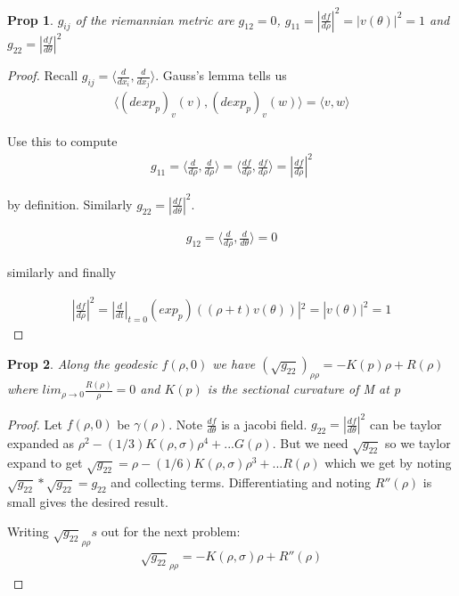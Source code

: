 \documentclass[11pt]{article}
\newtheorem{prop}{Prop}
\begin{document}
\begin{prop}
	$g_{ij}$ of the riemannian metric are $g_{12} = 0$, $g_{11} = |\frac{df}{d\rho}|^2 = |v(\theta)|^2 = 1$ and $g_{22} = |\frac{df}{d\theta}|^2$
\end{prop}

\begin{proof}
	Recall $g_{ij} = \langle \frac{d}{dx_i},\frac{d}{dx_j}\rangle$. Gauss's lemma tells us 
	\begin{align*}
		\langle (dexp_p)_v(v),(d exp_p)_v(w) \rangle  = \langle v,w\rangle
	\end{align*}

	Use this to compute
	\begin{align*}
		g_{11} = \langle \frac{d}{d \rho}, \frac{d}{d \rho}\rangle = \langle \frac{d f}{d \rho}, \frac{d f}{d \rho}\rangle = |\frac{d f}{d \rho}|^2
	\end{align*}

	by definition. Similarly $g_{22} = |\frac{d f}{d\theta}|^2$.

	\begin{align*}
		g_{12} = \langle \frac{d}{d \rho}, \frac{d}{d \theta} \rangle = 0 
	\end{align*}

	similarly and finally%

	\begin{align*}
		|\frac{df}{d\rho}|^2 = |\frac{d}{dt}|_{t=0}(exp_p)((\rho + t)v(\theta))|^2 = |v(\theta)|^2 = 1
	\end{align*}

\end{proof}

\begin{prop}
	Along the geodesic $f(\rho,0)$ we have
	$(\sqrt{g_{22}})_{\rho \rho} = -K(p)\rho + R(\rho)$ where $lim_{\rho \to 0} \frac{R(\rho)}{\rho} = 0$ and $K(p)$ is the sectional curvature of M at p
\end{prop}

\begin{proof}
	Let $f(\rho,0)$ be $\gamma(\rho)$. Note $\frac{df}{d\theta}$ is a jacobi field. %
	$g_{22}=|\frac{df}{d\theta}|^2$ can be taylor expanded as $\rho^2 - (1/3)K(\rho,\sigma)\rho^4 + ... G(\rho)$. But we need $\sqrt{g_{22}}$ so we taylor expand to get $\sqrt{g_{22}} = \rho - (1/6)K(\rho,\sigma)\rho^3 + ... R(\rho)$ which we get by noting $\sqrt{g_{22}} * \sqrt{g_{22}} = g_{22}$ and collecting terms. Differentiating and noting $R''(\rho)$ is small gives the desired result. 

	Writing $\sqrt{g_{22}}_{\rho \rho}s$ out for the next problem:
	\begin{align*}
		\sqrt{g_{22}}_{\rho \rho} = -K(\rho,\sigma)\rho + R''(\rho)
	\end{align*}
\end{proof}
\end{document}
